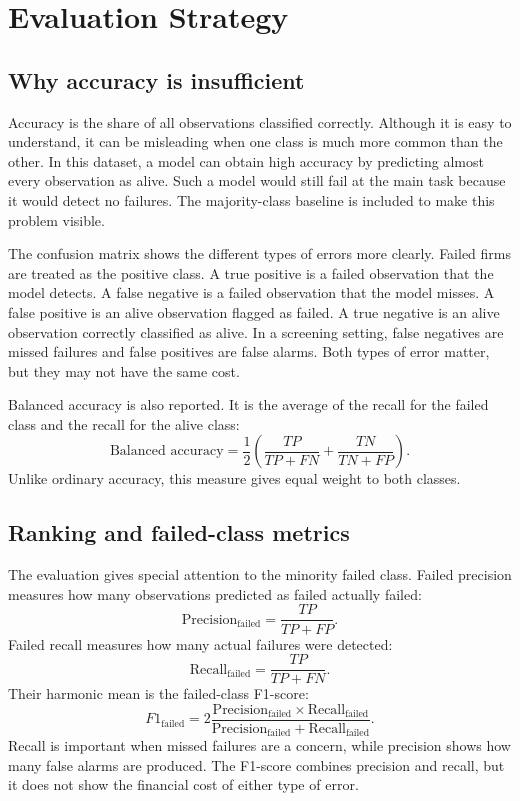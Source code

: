 \documentclass[11pt,a4paper]{article}
\begin{document}
\section{Evaluation Strategy}
\label{sec:evaluation}

\subsection{Why accuracy is insufficient}

Accuracy is the share of all observations classified correctly. Although it is
easy to understand, it can be misleading when one class is much more common
than the other. In this dataset, a model can obtain high accuracy by predicting
almost every observation as alive. Such a model would still fail at the main
task because it would detect no failures. The majority-class baseline is
included to make this problem visible.

The confusion matrix shows the different types of errors more clearly. Failed firms are
treated as the positive class. A true positive is a failed observation that the
model detects. A false negative is a failed observation that the model misses.
A false positive is an alive observation flagged as failed. A true negative is
an alive observation correctly classified as alive. In a screening setting,
false negatives are missed failures and false positives are false alarms. Both
types of error matter, but they may not have the same cost.

Balanced accuracy is also reported. It is the average of the recall for the
failed class and the recall for the alive class:
\begin{equation}
  \text{Balanced accuracy}
  = \frac{1}{2}\left(
  \frac{TP}{TP+FN} + \frac{TN}{TN+FP}
  \right).
\end{equation}
Unlike ordinary accuracy, this measure gives equal weight to both classes.

\subsection{Ranking and failed-class metrics}

The evaluation gives special attention to the minority failed class. Failed
precision measures how many observations predicted as failed actually failed:
\begin{equation}
  \text{Precision}_{\text{failed}} = \frac{TP}{TP+FP}.
\end{equation}
Failed recall measures how many actual failures were detected:
\begin{equation}
  \text{Recall}_{\text{failed}} = \frac{TP}{TP+FN}.
\end{equation}
Their harmonic mean is the failed-class F1-score:
\begin{equation}
  F1_{\text{failed}}
  = 2\frac{\text{Precision}_{\text{failed}}
  \times \text{Recall}_{\text{failed}}}
  {\text{Precision}_{\text{failed}}+\text{Recall}_{\text{failed}}}.
\end{equation}
Recall is important when missed failures are a concern, while precision shows
how many false alarms are produced. The F1-score combines precision and recall,
but it does not show the financial cost of either type of error.
\end{document}
